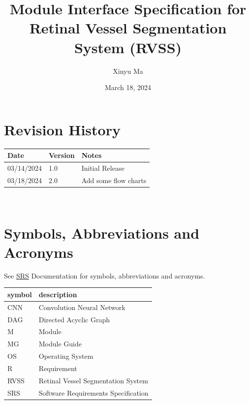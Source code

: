 \documentclass[12pt, titlepage]{article}
\begin{document}
\title{Module Interface Specification for Retinal Vessel Segmentation System (RVSS)}

\author{Xinyu Ma}

\date{March 18, 2024}

\maketitle


\section{Revision History}

\begin{tabularx}{\textwidth}{p{3cm}p{2cm}X}
\toprule {\bf Date} & {\bf Version} & {\bf Notes}\\
\midrule
03/14/2024 & 1.0 & Initial Release  \\
03/18/2024 & 2.0 & Add some flow charts  \\
\bottomrule
\end{tabularx}

~\newpage

\section{Symbols, Abbreviations and Acronyms}

See \href{https://github.com/lele0007/Blood-vessel-segmentation/blob/main/docs/SRS/SRS.pdf}{SRS} Documentation for symbols, abbreviations and acronyms. \\ 

\renewcommand{\arraystretch}{1.2}
\begin{tabular}{l l} 
  \toprule		
  \textbf{symbol} & \textbf{description}\\
  \midrule 
  CNN & Convolution Neural Network\\
  DAG & Directed Acyclic Graph \\
  M & Module \\
  MG & Module Guide \\
  OS & Operating System \\
  R & Requirement\\
  RVSS & Retinal Vessel Segmentation System \\ 
  SRS & Software Requirements Specification\\
  \bottomrule
\end{tabular}\\
\end{document}
